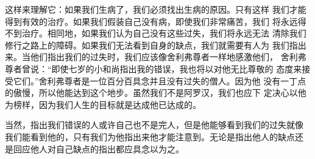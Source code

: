 这样来理解它：如果我们生病了，我们必须找出生病的原因。只有这样
我们才能得到有效的治疗。如果我们假装自己没有病，即使我们非常痛苦，我们
将永远得不到治疗。相同地，如果我们认为自己没有这些过失，我们将永远无法
清除我们修行之路上的障碍。如果我们无法看到自身的缺点，我们就需要有人为
我们指出来。当他们指出我们的过失时，我们应该像舍利弗尊者一样地感激他们，
舍利弗尊者曾说：“即使七岁的小和尚指出我的错误，我也将以对他无比尊敬的
态度来接受它们。”舍利弗尊者是一位百分百具念并且没有过失的僧人。因为他
没有一丁点的傲慢，所以他能达到这个地步。虽然我们不是阿罗汉，我们也应下
定决心以他为榜样，因为我们人生的目标就是达成他已达成的。

当然，指出我们错误的人或许自己也不是完人，但是他能够看到我们的过失就像
我们能看到他的，只有我们为他指出来他才能注意到。无论是指出他人的缺点还
是回应他人对自己缺点的指出都应具念以为之。

\endchapter

\byebye
